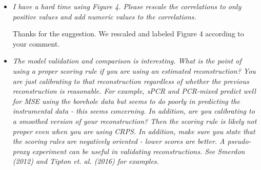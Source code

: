 \documentclass[11pt]{article}
\begin{document}
\begin{itemize}
\item \textit{I have a hard time using Figure 4. Please rescale the correlations
    to only positive values and add numeric values to the correlations.}

  Thanks for the suggestion. We rescaled and labeled Figure 4 according to your comment.

  
\item \textit{The model validation and comparison is interesting. What is the
    point of using a proper scoring rule if you are using an estimated reconstruction? You are just calibrating to that reconstruction regardless of
whether the previous reconstruction is reasonable. For example, sPCR and
PCR-mixed predict well for MSE using the borehole data but seems to do poorly in
predicting the instrumental data - this seems concerning. In addition, are you
calibrating to a smoothed version of your reconstruction? Then the scoring rule
is likely not proper even when you are using CRPS. In addition, make sure you
state that the scoring rules are negatively oriented - lower scores are better.
A pseudo-proxy experiment can be useful in validating reconstructions. See Smerdon (2012) and Tipton et. al. (2016) for examples.
}


\end{itemize}
\end{document}
